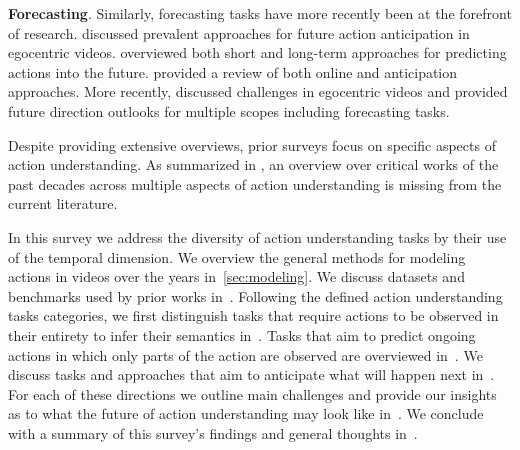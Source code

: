 \documentclass[smallextended,twocolumn,natbib]{svjour3}
\begin{document}
\noindent
\textbf{Forecasting}. Similarly, forecasting tasks have more recently been at the forefront of research. \citet{rodin2021predicting} discussed prevalent approaches for future action anticipation in egocentric videos. \citet{zhong2023survey} overviewed both short and long-term approaches for predicting actions into the future. \citet{hu2022online} provided a review of both online and anticipation approaches. More recently, \citet{plizzari2024outlook} discussed challenges in egocentric videos and provided future direction outlooks for multiple scopes including forecasting tasks.





 
  
Despite providing extensive overviews, prior surveys focus on specific aspects of action understanding. As summarized in , an overview over critical works of the past decades across multiple aspects of action understanding is missing from the current literature. 


In this survey we address the diversity of action understanding tasks by their use of the temporal dimension. We overview the general methods for modeling actions in videos over the years in~\ref{sec:modeling}. We discuss datasets and benchmarks used by prior works in~. Following the defined action understanding tasks categories, we first distinguish tasks that require actions to be observed in their entirety to infer their semantics in~. Tasks that aim to predict ongoing actions in which only parts of the action are observed are overviewed in~. We discuss tasks and approaches that aim to anticipate what will happen next in~. For each of these directions we outline main challenges and provide our insights as to what the future of action understanding may look like in~. We conclude with a summary of this survey's findings and general thoughts in~.
\end{document}

